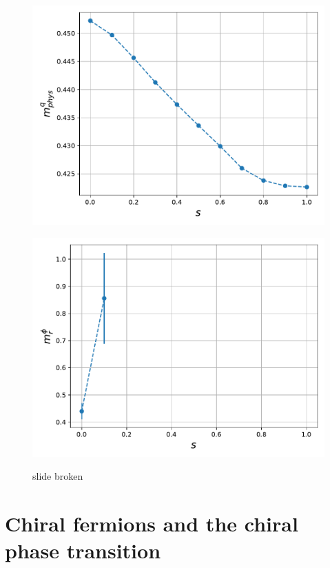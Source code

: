 \begin{figure}
\begin{minipage}{0.45\textwidth}
    \includegraphics[scale=0.52]{figures/slide_broken/mqphys.pdf}
    \label{fig:slide_broken_mqphys}
\end{minipage}
\hfill
\begin{minipage}{0.45\textwidth}
    \includegraphics[scale=0.52]{figures/slide_broken/mphir.pdf}
    \label{fig:slide_broken_mphir}
\end{minipage}
\caption{slide broken}
\label{fig:slide_broken}
\end{figure}

\section{Chiral fermions and the chiral phase transition}

